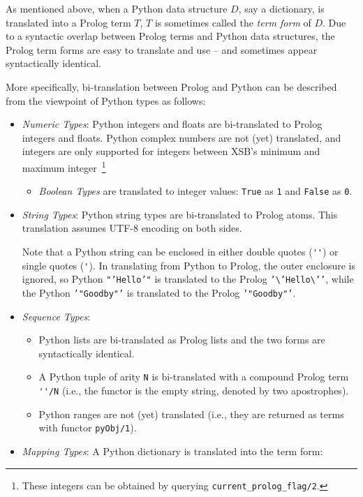 As mentioned above, when a Python data structure $D$, say a
dictionary, is translated into a Prolog term $T$, $T$ is sometimes
called the {\em term form} of $D$.  Due to a syntactic overlap between
Prolog terms and Python data structures, the Prolog term forms are
easy to translate and use -- and sometimes appear syntactically
identical.

More specifically, bi-translation between Prolog and Python can be
described from the viewpoint of Python types as follows: 

\begin{itemize}
       \item {\em Numeric Types}: Python integers and floats are
         bi-translated to Prolog integers and floats.  Python complex
         numbers are not (yet) translated, and integers are only
         supported for integers between XSB's minimum and maximum
         integer~\footnote{These integers can be obtained by querying
           {\tt current\_prolog\_flag/2}.}
         \begin{itemize}
           \item {\em Boolean Types} are
             translated to integer values: {\tt True} as {\tt 1}
             and {\tt False} as {\tt 0}.
         \end{itemize}
       \item {\em String Types}: Python string types are bi-translated
         to Prolog atoms.  This translation assumes UTF-8 encoding on
         both sides.

         Note that a Python string can be enclosed in either double
         quotes (\verb|''|) or single quotes (\verb|'|).  In
         translating from Python to Prolog, the outer enclosure is
         ignored, so Python {\tt "'Hello'"} is translated to the
         Prolog {\tt '\textbackslash{}'Hello\textbackslash{}'{}'},
         while the Python {\tt '"Goodby"'} is translated to the Prolog
         {\tt '"Goodby"'}.
       \item {\em Sequence Types}:
         \begin{itemize}
           \item Python lists are bi-translated as Prolog lists and
             the two forms are syntactically identical.
           \item A Python tuple of arity {\tt N} is bi-translated with
             a compound Prolog term \verb|''/N| (i.e., the functor is
             the empty string, denoted by two apostrophes).
             \item Python ranges are not (yet) translated (i.e., they
               are returned as terms with functor {\tt pyObj/1}).
         \end{itemize}
       \item {\em Mapping Types}: A Python dictionary is translated
         into the term form:


\end{itemize}
